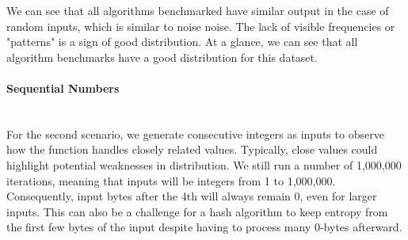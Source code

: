 \documentclass[10pt]{article}
\begin{document}
We can see that all algorithms benchmarked have similar output in the case of random inputs, which is similar to noise noise. The lack of visible frequencies or "patterns" is a sign of good distribution. At a glance, we can see that all algorithm benchmarks have a good distribution for this dataset.

\clearpage
\paragraph{Sequential Numbers}\leavevmode\\
For the second scenario, we generate consecutive integers as inputs to observe how the function handles closely related values. Typically, close values could highlight potential weaknesses in distribution. We still run a number of 1,000,000 iterations, meaning that inputs will be integers from 1 to 1,000,000. Consequently, input bytes after the 4th will always remain 0, even for larger inputs. This can also be a challenge for a hash algorithm to keep entropy from the first few bytes of the input despite having to process many 0-bytes afterward.
\end{document}
